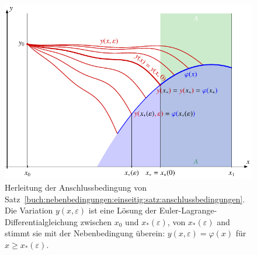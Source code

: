 %
%
%
\begin{figure}
\centering
\includegraphics{chapters/050-nebenbedingungen/images/einseitig.pdf}
\caption{Herleitung der Anschlussbedingung von
Satz~\ref{buch:nebenbedingungen:einseitig:satz:anschlussbedingungen}.
Die Variation $y(x,\varepsilon)$ ist eine Lösung der
Euler-Lagrange-Differentialgleichung zwischen $x_0$ und $x_*(\varepsilon)$,
von $x_*(\varepsilon)$ and stimmt sie mit der Nebenbedingung überein:
$y(x,\varepsilon) = \varphi(x)$ für $x\ge x_*(\varepsilon)$.
\label{buch:nebenbedingungen:einseitig:fig:einseitig}}
\end{figure}
